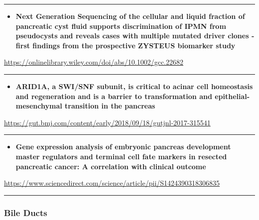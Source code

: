 \documentclass[]{article}
\providecommand{\tightlist}{%
  \setlength{\itemsep}{0pt}\setlength{\parskip}{0pt}}
\begin{document}
\begin{center}\rule{0.5\linewidth}{\linethickness}\end{center}

\begin{itemize}
\tightlist
\item
  \textbf{Next Generation Sequencing of the cellular and liquid fraction
  of pancreatic cyst fluid supports discrimination of IPMN from
  pseudocysts and reveals cases with multiple mutated driver clones ‐
  first findings from the prospective ZYSTEUS biomarker study}
\end{itemize}

\url{https://onlinelibrary.wiley.com/doi/abs/10.1002/gcc.22682}

\begin{center}\rule{0.5\linewidth}{\linethickness}\end{center}

\begin{itemize}
\tightlist
\item
  \textbf{ARID1A, a SWI/SNF subunit, is critical to acinar cell
  homeostasis and regeneration and is a barrier to transformation and
  epithelial-mesenchymal transition in the pancreas}
\end{itemize}

\url{https://gut.bmj.com/content/early/2018/09/18/gutjnl-2017-315541}

\begin{center}\rule{0.5\linewidth}{\linethickness}\end{center}

\begin{itemize}
\tightlist
\item
  \textbf{Gene expression analysis of embryonic pancreas development
  master regulators and terminal cell fate markers in resected
  pancreatic cancer: A correlation with clinical outcome}
\end{itemize}

\url{https://www.sciencedirect.com/science/article/pii/S1424390318306835}

\begin{center}\rule{0.5\linewidth}{\linethickness}\end{center}

\hypertarget{bile-ducts-2}{%
\subsubsection{Bile Ducts}\label{bile-ducts-2}}
\end{document}
